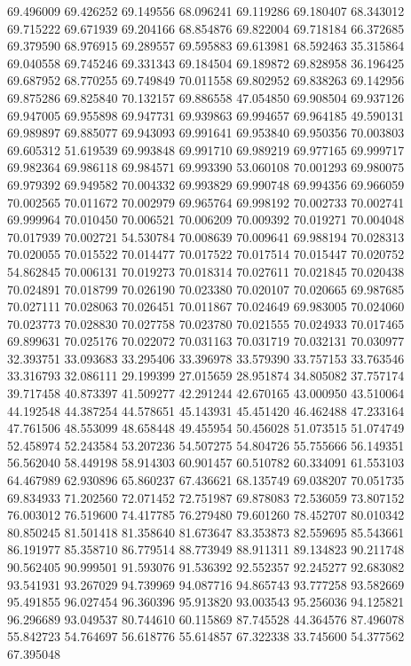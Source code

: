 69.496009
69.426252
69.149556
68.096241
69.119286
69.180407
68.343012
69.715222
69.671939
69.204166
68.854876
69.822004
69.718184
66.372685
69.379590
68.976915
69.289557
69.595883
69.613981
68.592463
35.315864
69.040558
69.745246
69.331343
69.184504
69.189872
69.828958
36.196425
69.687952
68.770255
69.749849
70.011558
69.802952
69.838263
69.142956
69.875286
69.825840
70.132157
69.886558
47.054850
69.908504
69.937126
69.947005
69.955898
69.947731
69.939863
69.994657
69.964185
49.590131
69.989897
69.885077
69.943093
69.991641
69.953840
69.950356
70.003803
69.605312
51.619539
69.993848
69.991710
69.989219
69.977165
69.999717
69.982364
69.986118
69.984571
69.993390
53.060108
70.001293
69.980075
69.979392
69.949582
70.004332
69.993829
69.990748
69.994356
69.966059
70.002565
70.011672
70.002979
69.965764
69.998192
70.002733
70.002741
69.999964
70.010450
70.006521
70.006209
70.009392
70.019271
70.004048
70.017939
70.002721
54.530784
70.008639
70.009641
69.988194
70.028313
70.020055
70.015522
70.014477
70.017522
70.017514
70.015447
70.020752
54.862845
70.006131
70.019273
70.018314
70.027611
70.021845
70.020438
70.024891
70.018799
70.026190
70.023380
70.020107
70.020665
69.987685
70.027111
70.028063
70.026451
70.011867
70.024649
69.983005
70.024060
70.023773
70.028830
70.027758
70.023780
70.021555
70.024933
70.017465
69.899631
70.025176
70.022072
70.031163
70.031719
70.032131
70.030977
32.393751
33.093683
33.295406
33.396978
33.579390
33.757153
33.763546
33.316793
32.086111
29.199399
27.015659
28.951874
34.805082
37.757174
39.717458
40.873397
41.509277
42.291244
42.670165
43.000950
43.510064
44.192548
44.387254
44.578651
45.143931
45.451420
46.462488
47.233164
47.761506
48.553099
48.658448
49.455954
50.456028
51.073515
51.074749
52.458974
52.243584
53.207236
54.507275
54.804726
55.755666
56.149351
56.562040
58.449198
58.914303
60.901457
60.510782
60.334091
61.553103
64.467989
62.930896
65.860237
67.436621
68.135749
69.038207
70.051735
69.834933
71.202560
72.071452
72.751987
69.878083
72.536059
73.807152
76.003012
76.519600
74.417785
76.279480
79.601260
78.452707
80.010342
80.850245
81.501418
81.358640
81.673647
83.353873
82.559695
85.543661
86.191977
85.358710
86.779514
88.773949
88.911311
89.134823
90.211748
90.562405
90.999501
91.593076
91.536392
92.552357
92.245277
92.683082
93.541931
93.267029
94.739969
94.087716
94.865743
93.777258
93.582669
95.491855
96.027454
96.360396
95.913820
93.003543
95.256036
94.125821
96.296689
93.049537
80.744610
60.115869
87.745528
44.364576
87.496078
55.842723
54.764697
56.618776
55.614857
67.322338
33.745600
54.377562
67.395048
